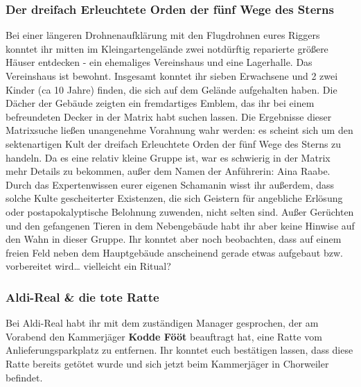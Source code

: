 \documentclass{ShadowTeXSR5}
\begin{document}
\hypertarget{der-dreifach-erleuchtete-orden-der-fuxfcnf-wege-des-sterns}{%
\subsubsection{Der dreifach Erleuchtete Orden der fünf Wege des Sterns}\label{der-dreifach-erleuchtete-orden-der-fuxfcnf-wege-des-sterns}}
Bei einer längeren Drohnenaufklärung mit den Flugdrohnen eures Riggers konntet ihr mitten im Kleingartengelände zwei notdürftig reparierte größere Häuser entdecken - ein ehemaliges Vereinshaus und eine Lagerhalle. Das Vereinshaus ist bewohnt. Insgesamt konntet ihr sieben Erwachsene und 2 zwei Kinder (ca 10 Jahre) finden, die sich auf dem Gelände aufgehalten haben. Die Dächer der Gebäude zeigten ein fremdartiges Emblem, das ihr bei einem befreundeten Decker in der Matrix habt suchen lassen.
Die Ergebnisse dieser Matrixsuche ließen unangenehme Vorahnung wahr werden: es scheint sich um den sektenartigen Kult der dreifach Erleuchtete Orden der fünf Wege des Sterns zu handeln. Da es eine relativ kleine Gruppe ist, war es schwierig in der Matrix mehr Details zu bekommen, außer dem Namen der Anführerin: Aina Raabe.
Durch das Expertenwissen eurer eigenen Schamanin wisst ihr außerdem, dass solche Kulte gescheiterter Existenzen, die sich Geistern für angebliche Erlösung oder postapokalyptische Belohnung zuwenden, nicht selten sind. Außer Gerüchten und den gefangenen Tieren in dem Nebengebäude habt ihr aber keine Hinwise auf den Wahn in dieser Gruppe. Ihr konntet aber noch beobachten, dass auf einem freien Feld neben dem Hauptgebäude anscheinend gerade etwas aufgebaut bzw. vorbereitet wird\ldots{} vielleicht ein Ritual?

\hypertarget{aldi-real-die-tote-ratte}{%
\subsubsection{Aldi-Real \& die tote Ratte}\label{aldi-real-die-tote-ratte}}
Bei Aldi-Real habt ihr mit dem zuständigen Manager gesprochen, der am Vorabend den Kammerjäger \textbf{Kodde Fööt} beauftragt hat, eine Ratte vom Anlieferungsparkplatz zu entfernen. Ihr konntet euch bestätigen lassen, dass diese Ratte bereits getötet wurde und sich jetzt beim Kammerjäger in Chorweiler befindet.
\end{document}
